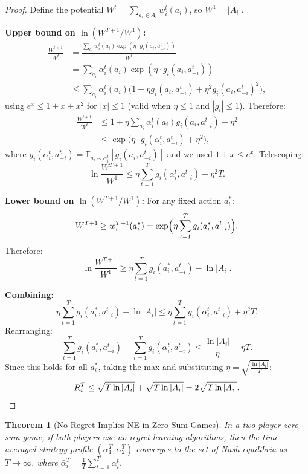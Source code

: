 \documentclass[11pt,a4paper]{article}
\theoremstyle{definition}
\theoremstyle{plain}
\newtheorem{theorem}{Theorem}[section]
\theoremstyle{remark}
\newcommand{\E}{\mathbb{E}}
\begin{document}
\begin{proof}
Define the potential $W^t = \sum_{a_i \in A_i} w_i^t(a_i)$, so $W^1 = |A_i|$.

\textbf{Upper bound on $\ln(W^{T+1}/W^1)$:}
\begin{align*}
    \frac{W^{t+1}}{W^t}
    &= \frac{\sum_{a_i} w_i^t(a_i) \exp(\eta \cdot g_i(a_i, a_{-i}^t))}{W^t} \\
    &= \sum_{a_i} \alpha_i^t(a_i) \exp(\eta \cdot g_i(a_i, a_{-i}^t)) \\
    &\leq \sum_{a_i} \alpha_i^t(a_i) \bigl(1 + \eta g_i(a_i, a_{-i}^t)
    + \eta^2 g_i(a_i, a_{-i}^t)^2\bigr),
\end{align*}
using $e^x \leq 1 + x + x^2$ for $|x| \leq 1$ (valid when $\eta \leq 1$ and
$|g_i| \leq 1$). Therefore:
\begin{align*}
    \frac{W^{t+1}}{W^t}
    &\leq 1 + \eta \sum_{a_i} \alpha_i^t(a_i) g_i(a_i, a_{-i}^t)
    + \eta^2 \\
    &\leq \exp\bigl(\eta \cdot g_i(\alpha_i^t, a_{-i}^t) + \eta^2\bigr),
\end{align*}
where $g_i(\alpha_i^t, a_{-i}^t) = \E_{a_i \sim \alpha_i^t}[g_i(a_i, a_{-i}^t)]$ and
we used $1 + x \leq e^x$. Telescoping:
\[
    \ln \frac{W^{T+1}}{W^1} \leq \eta \sum_{t=1}^T g_i(\alpha_i^t, a_{-i}^t) + \eta^2 T.
\]

\textbf{Lower bound on $\ln(W^{T+1}/W^1)$:}
For any fixed action $a_i^*$:
\[
    W^{T+1} \geq w_i^{T+1}(a_i^*) = \exp\Bigl(\eta \sum_{t=1}^T g_i(a_i^*, a_{-i}^t)\Bigr).
\]
Therefore:
\[
    \ln \frac{W^{T+1}}{W^1} \geq \eta \sum_{t=1}^T g_i(a_i^*, a_{-i}^t) - \ln |A_i|.
\]

\textbf{Combining:}
\[
    \eta \sum_{t=1}^T g_i(a_i^*, a_{-i}^t) - \ln |A_i|
    \leq \eta \sum_{t=1}^T g_i(\alpha_i^t, a_{-i}^t) + \eta^2 T.
\]
Rearranging:
\[
    \sum_{t=1}^T g_i(a_i^*, a_{-i}^t) - \sum_{t=1}^T g_i(\alpha_i^t, a_{-i}^t)
    \leq \frac{\ln |A_i|}{\eta} + \eta T.
\]
Since this holds for all $a_i^*$, taking the max and substituting
$\eta = \sqrt{\frac{\ln |A_i|}{T}}$:
\[
    R_i^T \leq \sqrt{T \ln |A_i|} + \sqrt{T \ln |A_i|} = 2\sqrt{T \ln |A_i|}.
    \qedhere
\]
\end{proof}

\begin{theorem}[No-Regret Implies NE in Zero-Sum Games]
\label{thm:no-regret-ne}
In a two-player zero-sum game, if both players use no-regret learning algorithms, then
the time-averaged strategy profile $(\bar{\alpha}_1^T, \bar{\alpha}_2^T)$ converges to the
set of Nash equilibria as $T \to \infty$, where
$\bar{\alpha}_i^T = \frac{1}{T}\sum_{t=1}^T \alpha_i^t$.
\end{theorem}
\end{document}
